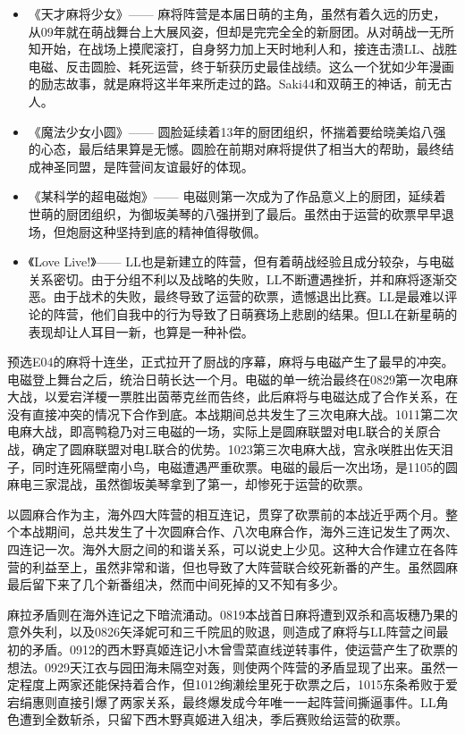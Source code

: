 \begin{itemize}
\item 《天才麻将少女》——
麻将阵营是本届日萌的主角，虽然有着久远的历史，从09年就在萌战舞台上大展风姿，但却是完完全全的新厨团。从对萌战一无所知开始，在战场上摸爬滚打，自身努力加上天时地利人和，接连击溃LL、战胜电磁、反击圆脸、耗死运营，终于斩获历史最佳战绩。这么一个犹如少年漫画的励志故事，就是麻将这半年来所走过的路。Saki44和双萌王的神话，前无古人。
\item 《魔法少女小圆》——
圆脸延续着13年的厨团组织，怀揣着要给晓美焰八强的心态，最后结果算是无憾。圆脸在前期对麻将提供了相当大的帮助，最终结成神圣同盟，是阵营间友谊最好的体现。
\item 《某科学的超电磁炮》——
电磁则第一次成为了作品意义上的厨团，延续着世萌的厨团组织，为御坂美琴的八强拼到了最后。虽然由于运营的砍票早早退场，但炮厨这种坚持到底的精神值得敬佩。
\item 《Love Live!》——
LL也是新建立的阵营，但有着萌战经验且成分较杂，与电磁关系密切。由于分组不利以及战略的失败，LL不断遭遇挫折，并和麻将逐渐交恶。由于战术的失败，最终导致了运营的砍票，遗憾退出比赛。LL是最难以评论的阵营，他们自我中的行为导致了日萌赛场上悲剧的结果。但LL在新星萌的表现却让人耳目一新，也算是一种补偿。
\end{itemize}

预选E04的麻将十连坐，正式拉开了厨战的序幕，麻将与电磁产生了最早的冲突。电磁登上舞台之后，统治日萌长达一个月。电磁的单一统治最终在0829第一次电麻大战，以爱宕洋榎一票胜出茵蒂克丝而告终，此后麻将与电磁达成了合作关系，在没有直接冲突的情况下合作到底。本战期间总共发生了三次电麻大战。1011第二次电麻大战，即高鸭稳乃对三电磁的一场，实际上是圆麻联盟对电L联合的关原合战，确定了圆麻联盟对电L联合的优势。1023第三次电麻大战，宫永咲胜出佐天泪子，同时连死隔壁南小鸟，电磁遭遇严重砍票。电磁的最后一次出场，是1105的圆麻电三家混战，虽然御坂美琴拿到了第一，却惨死于运营的砍票。

以圆麻合作为主，海外四大阵营的相互连记，贯穿了砍票前的本战近乎两个月。整个本战期间，总共发生了十次圆麻合作、八次电麻合作，海外三连记发生了两次、四连记一次。海外大厨之间的和谐关系，可以说史上少见。这种大合作建立在各阵营的利益至上，虽然非常和谐，但也导致了大阵营联合绞死新番的产生。虽然圆麻最后留下来了几个新番组决，然而中间死掉的又不知有多少。

麻拉矛盾则在海外连记之下暗流涌动。0819本战首日麻将遭到双杀和高坂穗乃果的意外失利，以及0826矢泽妮可和三千院凪的败退，则造成了麻将与LL阵营之间最初的矛盾。0912的西木野真姬连记小木曾雪菜直线逆转事件，使运营产生了砍票的想法。0929天江衣与园田海未隔空对轰，则使两个阵营的矛盾显现了出来。虽然一定程度上两家还能保持着合作，但1012绚濑绘里死于砍票之后，1015东条希败于爱宕绢惠则直接引爆了两家关系，最终爆发成今年唯一一起阵营间撕逼事件。LL角色遭到全数斩杀，只留下西木野真姬进入组决，季后赛败给运营的砍票。

